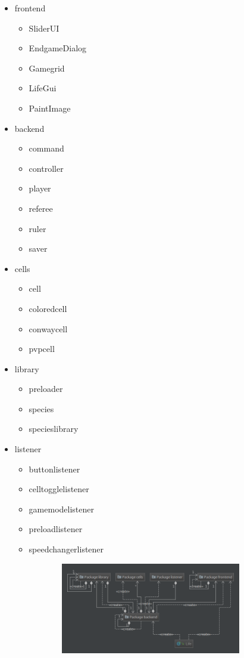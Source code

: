 \documentclass[12pt]{article}
\theoremstyle{plain}
\begin{document}
\begin{itemize}
\item
frontend
\begin{itemize}
\item
SliderUI
\item
EndgameDialog
\item
Gamegrid
\item
LifeGui
\item
PaintImage
\end{itemize}
\item
backend
\begin{itemize}
\item
command
\item
controller
\item
player
\item
referee
\item
ruler
\item
saver
\end{itemize}
\item
cells
\begin{itemize}
\item
cell
\item
coloredcell
\item
conwaycell
\item
pvpcell
\end{itemize}
\item
library
\begin{itemize}
\item
preloader
\item
species
\item
specieslibrary
\end{itemize}
\item
listener
\begin{itemize}
\item
buttonlistener
\item
celltogglelistener
\item
gamemodelistener
\item
preloadlistener
\item
speedchangerlistener
\end{itemize}
\end{itemize}
\begin{figure}[ht]
\centering
\includegraphics[width=1\textwidth, height=150px]{images/gogolPackages.png}
\end{figure}
\end{document}
